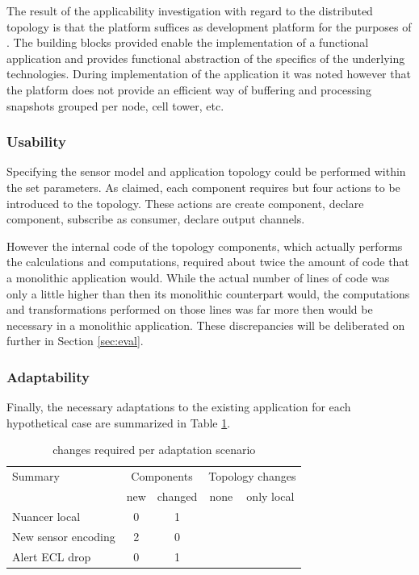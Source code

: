 The result of the applicability investigation with regard to the distributed topology is that the platform suffices as development platform for the purposes of \idsystems. The building blocks provided enable the implementation of a functional application and provides functional abstraction of the specifics of the underlying technologies.  During implementation of the application it was noted however that the platform does not provide an efficient way of buffering and processing snapshots grouped per node, cell tower, etc. 

\subsubsection{Usability}
Specifying the sensor model and application topology could be performed within the set parameters. As claimed, each component requires but four actions to be introduced to the topology. These actions are create component, declare component, subscribe as consumer, declare output channels.

However the internal code of the topology components, which actually performs the calculations and computations, required about twice the amount of code that a monolithic application would. While the actual number of lines of code was only a little higher than then its monolithic counterpart would, the computations and transformations performed on those lines was far more then would be necessary in a monolithic application. These discrepancies will be deliberated on further in Section \ref{sec:eval}.

\subsubsection{Adaptability}
Finally, the necessary adaptations to the existing application for each hypothetical case are summarized in Table \ref{table:adaptations}.

\begin{table}
\centering
\begin{tabular}{|l||c|c||c|c|} \hline
Summary				& \multicolumn{2}{c||}{Components}		& \multicolumn{2}{c|}{Topology changes} \\ 
					& new 	& changed 	& none 		& only local  \\ \hline 
Nuancer local		& 0		& 1			&			& \cmark \\ \hline
New sensor encoding	& 2		& 0			& 			& \cmark \\ \hline
Alert ECL drop		& 0		& 1			& \cmark	&		 \\ \hline
\end{tabular}
\caption{changes required per adaptation scenario}
\label{table:adaptations}
\end{table}

